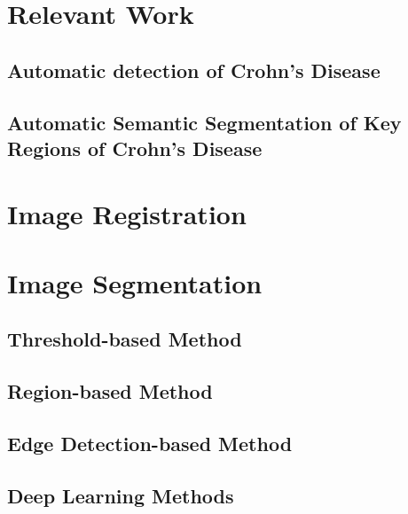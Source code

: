 \section{Relevant Work}
\subsection{Automatic detection of Crohn's Disease}

\subsection{Automatic Semantic Segmentation of Key Regions of Crohn's Disease}

\section{Image Registration}

\section{Image Segmentation}

\subsection{Threshold-based Method}

\subsection{Region-based Method}

\subsection{Edge Detection-based Method}

\subsection{Deep Learning Methods}








